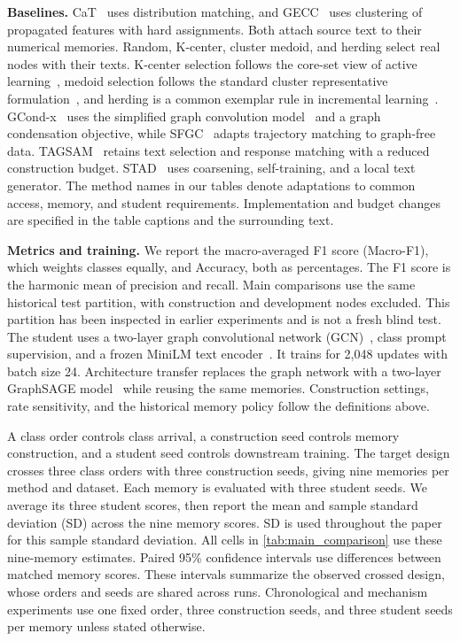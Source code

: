 \noindent\textbf{Baselines.}
CaT~\cite{cat} uses distribution matching, and GECC~\cite{gecc} uses
clustering of propagated features with hard assignments. Both attach source
text to their numerical memories. Random, K-center, cluster medoid, and
herding select real nodes with their texts. K-center selection follows the
core-set view of active learning~\cite{kcenter}, medoid selection follows
the standard cluster representative formulation~\cite{kmedoids}, and
herding is a common exemplar rule in incremental learning~\cite{icarl}.
GCond-x~\cite{gcond} uses the simplified graph convolution model~\cite{sgc}
and a graph condensation objective, while SFGC~\cite{sfgc} adapts trajectory
matching to graph-free data. TAGSAM~\cite{tagsam} retains text selection and
response matching with a reduced construction budget. STAD~\cite{stad} uses
coarsening, self-training, and a local text generator. The method names in
our tables denote adaptations to common access, memory, and student
requirements. Implementation and budget changes are specified in the table
captions and the surrounding text.

\noindent\textbf{Metrics and training.}
We report the macro-averaged F1 score (Macro-F1), which weights classes
equally, and Accuracy, both as percentages. The F1 score is the harmonic
mean of precision and recall. Main comparisons use the same historical test
partition, with construction and development nodes excluded. This partition
has been inspected in earlier experiments and is not a fresh blind test. The
student uses a two-layer graph convolutional network (GCN)~\cite{gcn}, class
prompt supervision, and a frozen MiniLM text encoder~\cite{minilm}. It trains
for 2,048 updates with batch size 24. Architecture transfer replaces the
graph network with a two-layer GraphSAGE model~\cite{graphsage} while reusing
the same memories. Construction settings, rate sensitivity, and the
historical memory policy follow the definitions above.

A class order controls class arrival, a construction seed controls memory
construction, and a student seed controls downstream training. The target
design crosses three class orders with three construction seeds, giving nine
memories per method and dataset. Each memory is evaluated with three student
seeds. We average its three student scores, then report the mean and sample
standard deviation (SD) across the nine memory scores. SD is used throughout
the paper for this sample standard deviation. All cells in
\autoref{tab:main_comparison} use these nine-memory estimates. Paired 95\%
confidence intervals use differences between matched memory scores. These
intervals summarize the observed crossed design, whose orders and seeds are
shared across runs. Chronological and mechanism experiments use one fixed
order, three construction seeds, and three student seeds per memory unless
stated otherwise.
